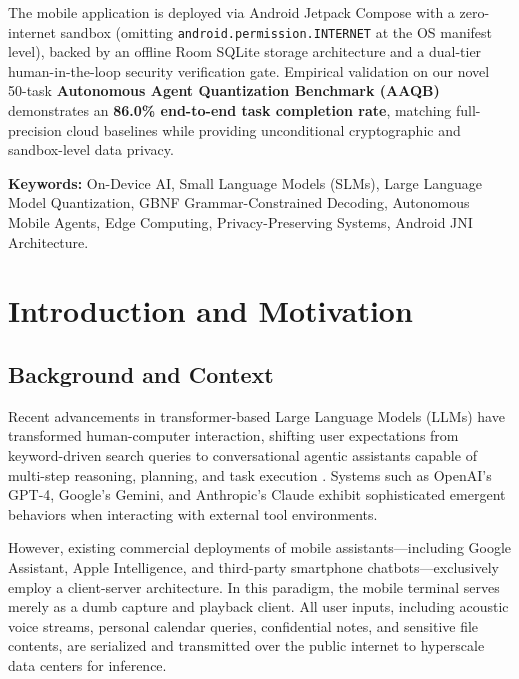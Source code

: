\documentclass[12pt,a4paper,oneside]{report}
\begin{document}
The mobile application is deployed via Android Jetpack Compose with a zero-internet sandbox (omitting \texttt{android.permission.INTERNET} at the OS manifest level), backed by an offline Room SQLite storage architecture and a dual-tier human-in-the-loop security verification gate. Empirical validation on our novel 50-task \textbf{Autonomous Agent Quantization Benchmark (AAQB)} demonstrates an \textbf{86.0\% end-to-end task completion rate}, matching full-precision cloud baselines while providing unconditional cryptographic and sandbox-level data privacy.

\vspace{0.5cm}
\noindent \textbf{Keywords:} On-Device AI, Small Language Models (SLMs), Large Language Model Quantization, GBNF Grammar-Constrained Decoding, Autonomous Mobile Agents, Edge Computing, Privacy-Preserving Systems, Android JNI Architecture.

\newpage
\tableofcontents
\newpage
\listoffigures
\listoftables

\newpage
\chapter{Introduction and Motivation}

\section{Background and Context}
Recent advancements in transformer-based Large Language Models (LLMs) have transformed human-computer interaction, shifting user expectations from keyword-driven search queries to conversational agentic assistants capable of multi-step reasoning, planning, and task execution \cite{vaswani2017attention, brown2020language}. Systems such as OpenAI's GPT-4, Google's Gemini, and Anthropic's Claude exhibit sophisticated emergent behaviors when interacting with external tool environments.

However, existing commercial deployments of mobile assistants—including Google Assistant, Apple Intelligence, and third-party smartphone chatbots—exclusively employ a client-server architecture. In this paradigm, the mobile terminal serves merely as a dumb capture and playback client. All user inputs, including acoustic voice streams, personal calendar queries, confidential notes, and sensitive file contents, are serialized and transmitted over the public internet to hyperscale data centers for inference.
\end{document}
